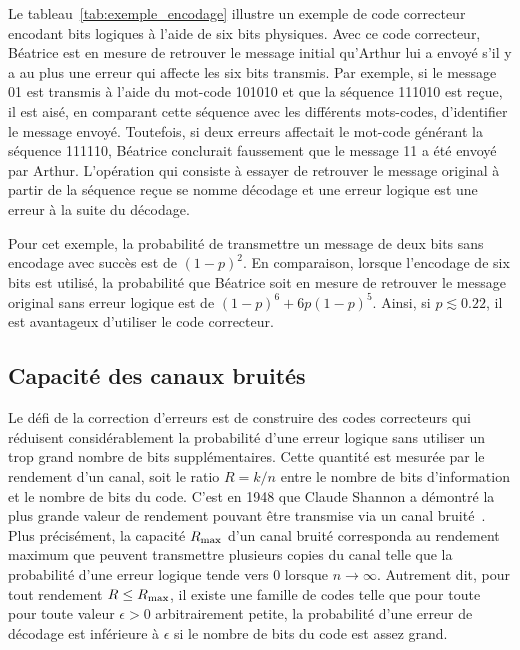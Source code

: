 Le tableau~\ref{tab:exemple_encodage} illustre un exemple de code correcteur
encodant  bits logiques à l'aide de six bits physiques.
Avec ce code correcteur,
Béatrice est en mesure de retrouver le message initial qu'Arthur lui a
envoyé s'il y a au plus une erreur qui affecte les six bits transmis. 
Par exemple, si le message 01 est transmis à l'aide du mot-code 
101010 et que la séquence 111010 est reçue, 
il est aisé, en comparant cette séquence avec les différents 
mots-codes, d'identifier le message envoyé. 
Toutefois, 
si deux erreurs affectait le mot-code générant la séquence 111110, 
Béatrice conclurait faussement que le message 11 a été envoyé par Arthur.
L'opération qui consiste à essayer de retrouver le message original à partir
de la séquence reçue se nomme décodage 
et une erreur logique est une erreur à la suite du décodage.

Pour cet exemple,
la probabilité de transmettre un message de deux bits sans encodage avec succès 
est de $(1 - p)^2$. 
En comparaison,
lorsque l'encodage de six bits est utilisé, 
la probabilité que Béatrice soit en mesure de retrouver le message original 
sans erreur logique est de $(1 - p)^6 + 6p(1 - p)^5$.
Ainsi, si $p \lesssim 0.22$, il est avantageux d'utiliser le code correcteur.

\subsection{Capacité des canaux bruités}

Le défi de la correction d'erreurs est de construire des codes correcteurs 
qui réduisent considérablement la probabilité d'une erreur logique sans utiliser 
un trop grand nombre de bits supplémentaires.
Cette quantité est mesurée par le rendement d'un canal, 
soit le ratio $R = k/n$ entre le nombre de bits d'information et le 
nombre de bits du code. 
C'est en 1948 que Claude Shannon a démontré la plus grande valeur 
de rendement pouvant être transmise via un canal bruité~\cite{shannon_mathematical_1948}.
Plus précisément,
la capacité $R_{\text{max}}$ d'un canal bruité corresponda au rendement maximum 
que peuvent transmettre plusieurs copies du canal telle que la probabilité d'une 
erreur logique tende vers 0 lorsque $n \to \infty$.
Autrement dit,
pour tout rendement $R \leq R_{\text{max}} $, 
il existe une famille de codes 
telle que pour toute pour toute valeur $\epsilon > 0$ arbitrairement petite, 
la probabilité d'une erreur de décodage est inférieure à $\epsilon$ si le 
nombre de bits du code est assez grand.

